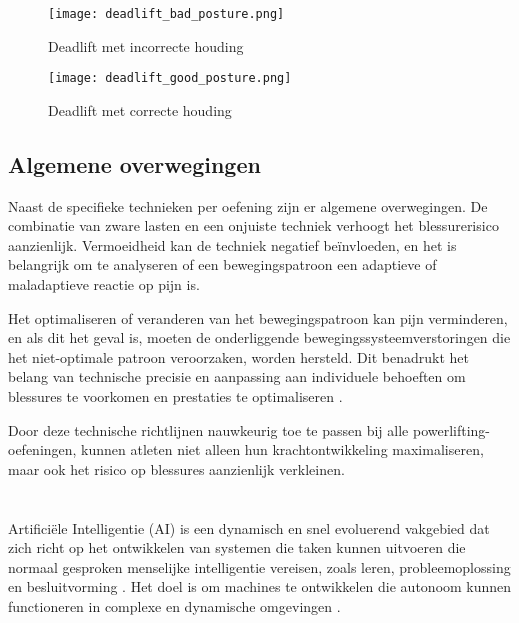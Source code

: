 \begin{figure}[h]
  \centering
  \begin{minipage}{0.45\textwidth}
      \centering
      \texttt{[image: deadlift\_bad\_posture.png]}
      \caption[Deadlift met incorrecte houding]{\label{fig:deadlift_incorrect}Deadlift met incorrecte houding \autocite{BirdEtAl2010}}
  \end{minipage}
  \hfill %
  \begin{minipage}{0.45\textwidth}
      \centering
      \texttt{[image: deadlift\_good\_posture.png]}
      \caption[Deadlift met correcte houding]{\label{fig:deadlift_correct}Deadlift met correcte houding \autocite{BirdEtAl2010}}
  \end{minipage}
\end{figure}   

\subsection{Algemene overwegingen}
Naast de specifieke technieken per oefening zijn er algemene overwegingen. De combinatie van zware lasten en een onjuiste techniek verhoogt het blessurerisico aanzienlijk. 
Vermoeidheid kan de techniek negatief beïnvloeden, en het is belangrijk om te analyseren of een bewegingspatroon een adaptieve of maladaptieve reactie op pijn is.

Het optimaliseren of veranderen van het bewegingspatroon kan pijn verminderen, en als dit het geval is, moeten de onderliggende bewegingssysteemverstoringen die het niet-optimale patroon veroorzaken, worden hersteld. 
Dit benadrukt het belang van technische precisie en aanpassing aan individuele behoeften om blessures te voorkomen en prestaties te optimaliseren \autocite{TymchikEtAl2021}.

\medskip

Door deze technische richtlijnen nauwkeurig toe te passen bij alle powerlifting-oefeningen, kunnen atleten niet alleen hun krachtontwikkeling maximaliseren, maar ook het risico op blessures aanzienlijk verkleinen.

\section{}%
\label{sec:artificiële-intelligentie}

Artificiële Intelligentie (AI) is een dynamisch en snel evoluerend vakgebied dat zich richt op het ontwikkelen van systemen die taken kunnen uitvoeren die normaal gesproken menselijke intelligentie vereisen, zoals leren, probleemoplossing en besluitvorming \autocite{SharifaniEtAl2023}.
Het doel is om machines te ontwikkelen die autonoom kunnen functioneren in complexe en dynamische omgevingen \autocite{Kouassi2023}.

